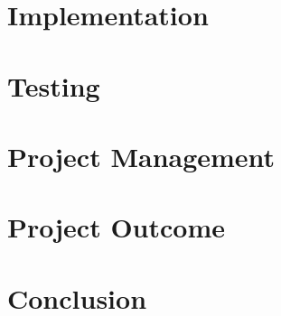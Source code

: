 \documentclass[12pt, a4paper, twoside]{book}
\begin{document}
\chapter{Implementation}
\label{chp:implementation}


%

\chapter{Testing}
\label{chp:testing}


\chapter{Project Management}
\label{chp:project_management}


\chapter{Project Outcome}
\label{chp:evaluation}


\chapter{Conclusion}
\label{chp:conclusions_further_work}


\pagestyle{empty}

\appendix


\backmatter

\printbibliography
{}
\end{document}
